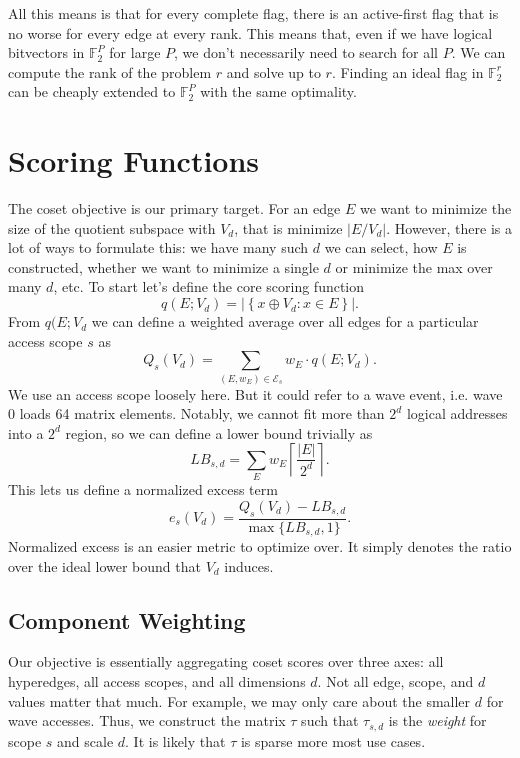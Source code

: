 \documentclass[10pt]{article}
\theoremstyle{remark}
\begin{document}
All this means is that for every complete flag, there is an active-first flag that is no worse for every edge at every rank.
This means that, even if we have logical bitvectors in $\mathbb{F}_2^P$ for large $P$, we don't necessarily need to search for all $P$. We can compute the rank of the problem $r$ and solve up to $r$. Finding an ideal flag in $\mathbb{F}_2^r$ can be cheaply extended to $\mathbb{F}_2^P$ with the same optimality.


\section{Scoring Functions}

The coset objective is our primary target. For an edge $E$ we want to minimize the size of the quotient subspace with $V_d$, that is minimize $|E/V_d|$. However, there is a lot of ways to formulate this: we have many such $d$ we can select, how $E$ is constructed, whether we want to minimize a single $d$ or minimize the max over many $d$, etc.
To start let's define the core scoring function
%
\[
q(E; V_d) = \left| \left\{ x \oplus V_d : x \in E \right\} \right|.
\]
%
From $q(E; V_d$ we can define a weighted average over all edges for a particular access scope $s$ as
%
\[
Q_s(V_d) = \sum_{(E,w_E)\in \mathcal{E}_s} w_E\cdot q(E; V_d).
\]
%
We use an access scope loosely here. But it could refer to a wave event, i.e. wave 0 loads 64 matrix elements. Notably, we cannot fit more than $2^d$ logical addresses into a $2^d$ region, so we can define a lower bound trivially as
%
\[
LB_{s,d} = \sum_{E} w_E \left\lceil \frac{|E|}{2^d} \right\rceil.
\]
%
This lets us define a normalized excess term
%
\[
e_s (V_d) = \frac{Q_s(V_d) - LB_{s,d}}{\max\{LB_{s,d}, 1\}}.
\]
%
Normalized excess is an easier metric to optimize over. It simply denotes the ratio over the ideal lower bound that $V_d$ induces.

\subsection{Component Weighting}

Our objective is essentially aggregating coset scores over three axes: all hyperedges, all access scopes, and all dimensions $d$. Not all edge, scope, and $d$ values matter that much. For example, we may only care about the smaller $d$ for wave accesses. Thus, we construct the matrix $\tau$ such that $\tau_{s,d}$ is the {\it weight} for scope $s$ and scale $d$. It is likely that $\tau$ is sparse more most use cases.
\end{document}
